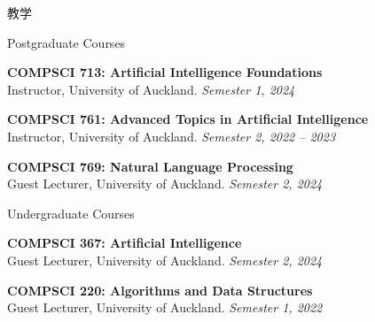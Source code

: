 \documentclass{resume} %
\begin{document}
\begin{rSection}{教学}
	\begin{rSubsection}{Postgraduate Courses}{}{}{}
	\item {\bf COMPSCI 713: Artificial Intelligence Foundations}\\ Instructor, University of Auckland. \hfill {\em Semester 1, 2024}
	\item {\bf COMPSCI 761: Advanced Topics in Artificial Intelligence}\\ Instructor, University of Auckland. \hfill {\em Semester 2, 2022 -- 2023}
	\item {\bf COMPSCI 769: Natural Language Processing}\\ Guest Lecturer, University of Auckland. \hfill {\em Semester 2, 2024} 
	\end{rSubsection}
	\begin{rSubsection}{Undergraduate Courses}{}{}{}
		\item {\bf COMPSCI 367: Artificial Intelligence}\\ Guest Lecturer, University of Auckland. \hfill {\em Semester 2, 2024}
		\item {\bf COMPSCI 220: Algorithms and Data Structures}\\ Guest Lecturer, University of Auckland. \hfill {\em Semester 1, 2022}
	\end{rSubsection}
\end{rSection}
\end{document}
